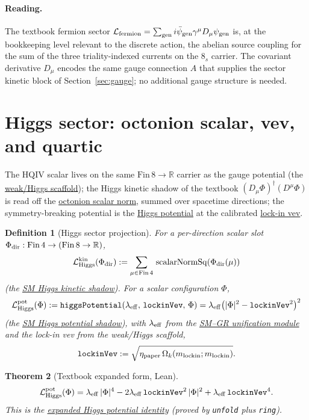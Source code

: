 \documentclass[11pt]{amsart}
\newtheorem{theorem}{Theorem}[section]
\newtheorem{definition}[theorem]{Definition}
\begin{document}
\paragraph{Reading.}
The textbook fermion sector
$\mathcal{L}_{\rm fermion}=\sum_{\rm gen}i\bar\psi_{\rm gen}\gamma^\mu D_\mu\psi_{\rm gen}$
is, at the bookkeeping level relevant to the discrete action, the abelian
source coupling for the sum of the three triality-indexed currents on
the $8_s$ carrier. The covariant derivative $D_\mu$ encodes the same gauge
connection $A$ that supplies the sector kinetic block of
Section~\ref{sec:gauge}; no additional gauge structure is needed.

\section{Higgs sector: octonion scalar, vev, and quartic}
\label{sec:higgs}

The HQIV scalar lives on the same $\mathrm{Fin}\,8\to\mathbb{R}$ carrier as
the gauge potential (the \hyperref[lean:weak-higgs]{weak/Higgs scaffold});
the Higgs kinetic shadow of the textbook $(D_\mu\Phi)^\dagger(D^\mu\Phi)$ is
read off the \hyperref[lean:scalar-norm]{octonion scalar norm}, summed over
spacetime directions; the symmetry-breaking potential is the
\hyperref[lean:higgs-pot]{Higgs potential} at the calibrated
\hyperref[lean:lockin-vev]{lock-in vev}.

\begin{definition}[Higgs sector projection]
\label{def:higgs}
For a per-direction scalar slot $\Phi_{\rm dir}:\mathrm{Fin}\,4\to(\mathrm{Fin}\,8\to\mathbb{R})$,
\[
\mathcal{L}_{\rm Higgs}^{\rm kin}(\Phi_{\rm dir})
:= \sum_{\mu\in\mathrm{Fin}\,4}\,\mathrm{scalarNormSq}(\Phi_{\rm dir}(\mu))
\]
(the \hyperref[lean:LSM-Higgs-kin]{SM Higgs kinetic shadow}). For a scalar
configuration $\Phi$,
\[
\mathcal{L}_{\rm Higgs}^{\rm pot}(\Phi)
:= \texttt{higgsPotential}(\lambda_{\rm eff},\,\texttt{lockinVev},\,\Phi)
= \lambda_{\rm eff}\bigl(|\Phi|^2 - \texttt{lockinVev}^2\bigr)^2
\]
(the \hyperref[lean:LSM-Higgs-pot]{SM Higgs potential shadow}), with
$\lambda_{\rm eff}$ from the \hyperref[lean:sm-gr]{SM--GR unification module}
and the lock-in vev from the weak/Higgs scaffold,
\[
\texttt{lockinVev}
:= \sqrt{\eta_{\rm paper}\,\Omega_k(m_{\rm lockin};m_{\rm lockin})}.
\]
\end{definition}

\begin{theorem}[Textbook expanded form, Lean]
\label{thm:higgs-expanded}
\[
\mathcal{L}_{\rm Higgs}^{\rm pot}(\Phi)
= \lambda_{\rm eff}\,|\Phi|^4
- 2\lambda_{\rm eff}\,\texttt{lockinVev}^2\,|\Phi|^2
+ \lambda_{\rm eff}\,\texttt{lockinVev}^4 .
\]
This is the \hyperref[lean:higgs-expanded]{expanded Higgs potential identity}
(proved by \texttt{unfold} plus \texttt{ring}).
\end{theorem}
\end{document}
